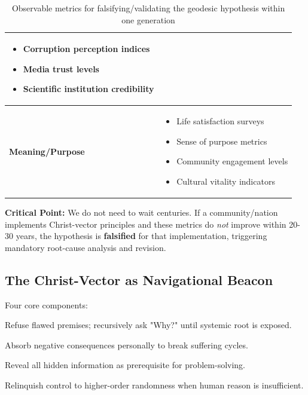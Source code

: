 \documentclass[11pt,a4paper]{article}
\theoremstyle{definition}
\theoremstyle{remark}
\begin{document}
\begin{table}[h]
\begin{tabular}{|l|p{8cm}|}
\begin{itemize}[nosep,leftmargin=*]
\item Corruption perception indices
\item Media trust levels
\item Scientific institution credibility
\end{itemize} \\
\hline
\textbf{Meaning/Purpose} & 
\begin{itemize}[nosep,leftmargin=*]
\item Life satisfaction surveys
\item Sense of purpose metrics
\item Community engagement levels
\item Cultural vitality indicators
\end{itemize} \\
\hline
\end{tabular}
\caption{Observable metrics for falsifying/validating the geodesic hypothesis within one generation}
\end{table}

\textbf{Critical Point:} We do not need to wait centuries. If a community/nation implements Christ-vector principles and these metrics do \textit{not} improve within 20-30 years, the hypothesis is \textbf{falsified} for that implementation, triggering mandatory root-cause analysis and revision.


\subsection{The Christ-Vector as Navigational Beacon}

Four core components:

\begin{description}[style=nextline]
\item[\textbf{Root-Cause Analysis}] Refuse flawed premises; recursively ask "Why?" until systemic root is exposed.

\item[\textbf{Radical Self-Sacrifice}] Absorb negative consequences personally to break suffering cycles.

\item[\textbf{Radical Honesty}] Reveal all hidden information as prerequisite for problem-solving.

\item[\textbf{Trust in Providence}] Relinquish control to higher-order randomness when human reason is insufficient.
\end{description}
\end{document}

